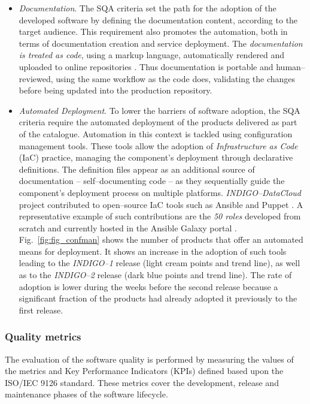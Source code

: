 \documentclass[journal]{IEEEtran}
\begin{document}
\begin{itemize}
\item \textit{Documentation}.
The SQA criteria set the path for the adoption of the developed software by
defining the documentation content, according to the target audience. This requirement also
promotes the automation, both in terms of documentation creation and service deployment. The
\textit{documentation is treated as code}, using a markup language, automatically rendered and
uploaded to online repositories \cite{foot1}.
Thus documentation is portable and
human--reviewed, using the same workflow as the code does, validating the changes before being
updated into the production repository.

\item \textit{Automated Deployment}.
To lower the barriers of software adoption, the SQA criteria require the automated
deployment of the products delivered as part of the catalogue. Automation in this context is
tackled using configuration management tools. These tools allow the adoption of
\textit{Infrastructure as Code} (IaC) practice, managing the component's deployment through declarative
definitions. The definition files appear as an additional source of documentation
-- self--documenting code -- as they sequentially guide the component's deployment process on multiple
platforms. {\sl INDIGO--DataCloud} project contributed to open--source IaC tools such
as Ansible
and Puppet \cite{foot2}. A representative example of
such contributions are the \textit{50 roles} developed from scratch and currently hosted in
the Ansible Galaxy portal \cite{foot3}. Fig.~\ref{fig:fig_confman}
shows the number of products that offer an automated means for deployment.
It shows an increase in the adoption of such tools leading to the {\sl INDIGO--1} release
(light cream points and trend line), as well as to the {\sl INDIGO--2} release
(dark blue points and trend line). The rate of adoption is lower during the weeks
before the second release because a significant fraction of the products had already adopted it
previously to the first release.
\end{itemize}

\subsubsection{Quality metrics}

The evaluation of the software quality is performed by measuring the values of
the metrics and Key Performance Indicators (KPIs) defined based upon the
ISO/IEC 9126 standard. These metrics cover the development, release and
maintenance phases of the software lifecycle.
\end{document}
